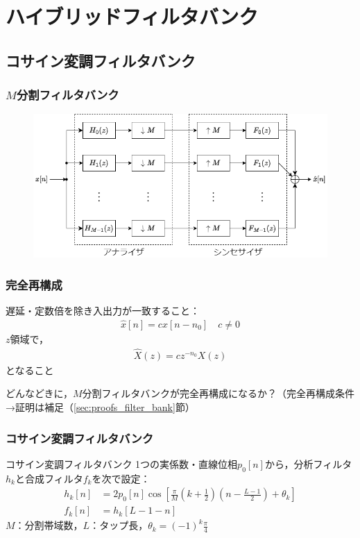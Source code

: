 \documentclass[14pt,xcolor=dvipsnames,table,dvipdfmx]{beamer}
\begin{document}
\section{ハイブリッドフィルタバンク}

\subsection{コサイン変調フィルタバンク}

\begin{frame}[c]
    \frametitle{$M$分割フィルタバンク}
    \begin{figure}
        \includegraphics[width=120mm]{./figs/filter_bank.drawio.png}
    \end{figure}
\end{frame}

\begin{frame}[c]
    \frametitle{完全再構成}
    遅延・定数倍を除き入出力が一致すること：
    \begin{align}
        \hat{x}[n] = c x[n - n_{0}] \quad c \neq 0
    \end{align}
    $z$領域で，
    \begin{align}
        \hat{X}(z) = c z^{-n_{0}} X(z)
    \end{align}
    となること
    \begin{block}{}
        どんなどきに，$M$分割フィルタバンクが完全再構成になるか？（完全再構成条件→証明は補足（\ref{sec:proofs_filter_bank}節）
    \end{block}
\end{frame}

\begin{frame}[c]
    \frametitle{コサイン変調フィルタバンク}
    \begin{block}{コサイン変調フィルタバンク}
        1つの実係数・直線位相$p_{0}[n]$から，分析フィルタ$h_{k}$と合成フィルタ$f_{k}$を次で設定：
        \begin{align}
            h_{k}[n] &= 2 p_{0}[n] \cos \left[ \frac{\pi}{M} \left( k + \frac{1}{2} \right) \left( n - \frac{L - 1}{2} \right) + \theta_{k} \right] \label{eq:cos_modulated_analysis_filter} \\
            f_{k}[n] &= h_{k}[L - 1 - n] \label{eq:cos_modulated_synthesis_filter}
        \end{align}
        $M$：分割帯域数，$L$：タップ長，$\theta_{k} = (-1)^{k} \frac{\pi}{4}$
    \end{block}
\end{frame}
\end{document}
